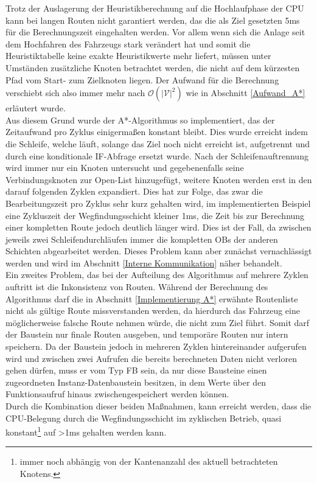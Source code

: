 			Trotz der Auslagerung der Heuristikberechnung auf die Hochlaufphase der CPU kann bei langen Routen nicht garantiert werden, das die als Ziel gesetzten 5ms für die Berechnungszeit eingehalten werden. Vor allem wenn sich die Anlage seit dem Hochfahren des Fahrzeugs stark verändert hat und somit die Heuristiktabelle keine exakte Heuristikwerte mehr liefert, müssen unter Umständen zusätzliche Knoten betrachtet werden, die nicht auf dem kürzesten Pfad vom Start- zum Zielknoten liegen. Der Aufwand für die Berechnung verschiebt sich also immer mehr nach $\mathcal{O}(|\mathcal{V}|^2)$ wie in Abschnitt \ref{Aufwand_A*} erläutert wurde.\\
			
			Aus diesem Grund wurde der A*-Algorithmus so implementiert, das der Zeitaufwand pro Zyklus einigermaßen konstant bleibt. Dies wurde erreicht indem die Schleife, welche läuft, solange das Ziel noch nicht erreicht ist, aufgetrennt und durch eine konditionale IF-Abfrage ersetzt wurde. Nach der Schleifenauftrennung wird immer nur ein Knoten untersucht und gegebenenfalls seine Verbindungsknoten zur Open-List hinzugefügt, weitere Knoten werden erst in den darauf folgenden Zyklen expandiert. Dies hat zur Folge, das zwar die Bearbeitungszeit pro Zyklus sehr kurz gehalten wird, im implementierten Beispiel eine Zykluszeit der Wegfindungsschicht kleiner 1ms, die Zeit bis zur Berechnung einer kompletten Route jedoch deutlich länger wird. Dies  ist der Fall, da zwischen jeweils zwei Schleifendurchläufen immer die kompletten \ac{OB}s der anderen Schichten abgearbeitet werden. Dieses Problem kann aber zunächst vernachlässigt werden und wird im Abschnitt \ref{Interne Kommunikation} näher behandelt.\\
			
			Ein zweites Problem, das bei der Aufteilung des Algorithmus auf mehrere Zyklen auftritt ist die Inkonsistenz von Routen. Während der Berechnung des Algorithmus darf die in Abschnitt \ref{Implementierung A*} erwähnte Routenliste nicht als gültige Route missverstanden werden, da hierdurch das Fahrzeug eine möglicherweise falsche Route nehmen würde, die nicht zum Ziel führt. Somit darf der Baustein nur finale Routen ausgeben, und temporäre Routen nur intern speichern. Da der Baustein jedoch in mehreren Zyklen hintereinander aufgerufen wird und zwischen zwei Aufrufen die bereits berechneten Daten nicht verloren gehen dürfen, muss er vom Typ \ac{FB} sein, da nur diese Bausteine einen zugeordneten Instanz-Datenbaustein besitzen, in dem Werte über den Funktionsaufruf hinaus zwischengespeichert werden können.\\
			Durch die Kombination dieser beiden Maßnahmen, kann erreicht werden, dass die CPU-Belegung durch die Wegfindungsschicht im zyklischen Betrieb, quasi konstant\footnote{immer noch abhängig von der Kantenanzahl des aktuell betrachteten Knotens. } auf >1ms gehalten werden kann.
		
